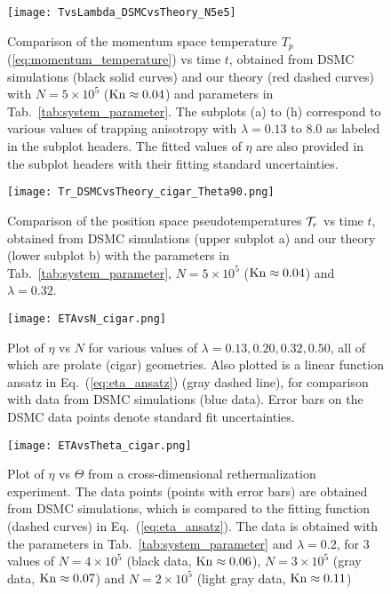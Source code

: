 \documentclass[reprint, amsmath, amssymb, aps, superscriptaddress]{revtex4-1}
\begin{document}
\onecolumngrid

\begin{figure}[ht]
    \centering
    \texttt{[image: TvsLambda\_DSMCvsTheory\_N5e5]}
    \caption{ Comparison of the momentum space temperature $T_p$ (\ref{eq:momentum_temperature}) vs time $t$, obtained from DSMC simulations (black solid curves) and our theory (red dashed curves) with $N = 5 \times 10^5$ (${\rm Kn} \approx 0.04$) and parameters in Tab.~\ref{tab:system_parameter}. The subplots (a) to (h) correspond to various values of trapping anisotropy with $\lambda = 0.13$ to $8.0$ as labeled in the subplot headers.
    The fitted values of $\eta$ are also provided in the subplot headers with their fitting standard uncertainties. }
    \label{fig:TvsLambda_DSMCvsTheory_N5e5}
\end{figure}

\twocolumngrid

\begin{figure}[ht]
    \centering
    \texttt{[image: Tr\_DSMCvsTheory\_cigar\_Theta90.png]}
    \caption{ Comparison of the position space pseudotemperatures ${\cal T}_r$ vs time $t$, obtained from DSMC simulations (upper subplot a) and our theory (lower subplot b) with the parameters in Tab.~\ref{tab:system_parameter}, $N = 5 \times 10^5$ (${\rm Kn} \approx 0.04$) and $\lambda = 0.32$.  }
    \label{fig:Tr_DSMCvsTheory_cigar_Theta90}
\end{figure}

 

\begin{figure}[ht]
    \centering
    \texttt{[image: ETAvsN\_cigar.png]}
    \caption{ Plot of $\eta$ vs $N$ for various values of $\lambda = 0.13, 0.20, 0.32, 0.50$, all of which are prolate (cigar) geometries. Also plotted is a linear function ansatz in Eq.~(\ref{eq:eta_ansatz}) (gray dashed line), for comparison with data from DSMC simulations (blue data). Error bars on the DSMC data points denote standard fit uncertainties. }
    \label{fig:ETAvsN_cigar}
\end{figure}

\begin{figure}[ht]
    \centering
    \texttt{[image: ETAvsTheta\_cigar.png]}
    \caption{ Plot of $\eta$ vs $\Theta$ from a cross-dimensional rethermalization experiment. The data points (points with error bars) are obtained from DSMC simulations, which is compared to the fitting function (dashed curves) in Eq.~(\ref{eq:eta_ansatz}). The data is obtained with the parameters in Tab.~\ref{tab:system_parameter} and $\lambda = 0.2$, for 3 values of $N = 4 \times 10^5$ (black data, ${\rm Kn} \approx 0.06$), $N = 3 \times 10^5$ (gray data, ${\rm Kn} \approx 0.07$) and $N = 2 \times 10^5$ (light gray data, ${\rm Kn} \approx 0.11$) }
    \label{fig:ETAvsTheta_cigar}
\end{figure}
\end{document}
